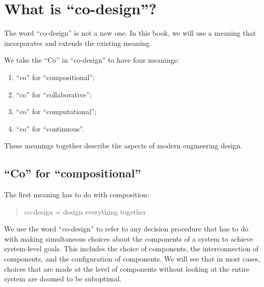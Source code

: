 
\section{What is ``co-design''?}
\label{sec:design-what-is-co-design}

The word ``co-design'' is not a new one.
In this book, we will use a meaning that incorporates and extends the existing meaning.

We take the ``Co'' in ``co-design'' to have four meanings:
\begin{enumerate}
    \item ``co'' for ``compositional'';
    \item ``co'' for ``collaborative'';
    \item ``co'' for ``computational'';
    \item ``co'' for ``continuous''.
\end{enumerate}
These meanings together describe the aspects of modern engineering design.

\subsection{``Co'' for ``compositional''}

The first meaning has to do with composition:

\begin{quote}
    co-design = design everything together
\end{quote}

We use the word ``co-design'' to refer to any decision procedure that has to do with making simultaneous choices about the components of a system to achieve system-level goals.
This includes the choice of components, the interconnection of components, and the configuration of components.
We will see that in most cases, choices that are made at the level of components without looking at the entire system are doomed to be suboptimal.

